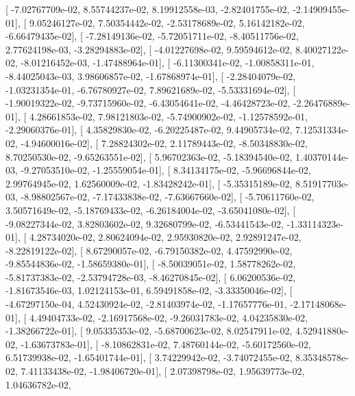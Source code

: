 \documentclass{article}
\begin{document}
       [ -7.02767709e-02,   8.55744237e-02,   8.19912558e-03,
         -2.82401755e-02,  -2.14909455e-01],
       [  9.05246127e-02,   7.50354442e-02,  -2.53178689e-02,
          5.16142182e-02,  -6.66479435e-02],
       [ -7.28149136e-02,  -5.72051711e-02,  -8.40511756e-02,
          2.77624198e-03,  -3.28294883e-02],
       [ -4.01227698e-02,   9.59594612e-02,   8.40027122e-02,
         -8.01216452e-03,  -1.47488964e-01],
       [ -6.11300341e-02,  -1.00858311e-01,  -8.44025043e-03,
          3.98606857e-02,  -1.67868974e-01],
       [ -2.28404079e-02,  -1.03231354e-01,  -6.76780927e-02,
          7.89621689e-02,  -5.53331694e-02],
       [ -1.90019322e-02,  -9.73715960e-02,  -6.43054641e-02,
         -4.46428723e-02,  -2.26476889e-01],
       [  4.28661853e-02,   7.98121803e-02,  -5.74900902e-02,
         -1.12578592e-01,  -2.29060376e-01],
       [  4.35829830e-02,  -6.20225487e-02,   9.44905734e-02,
          7.12531334e-02,  -4.94600016e-02],
       [  7.28824302e-02,   2.11789443e-02,  -8.50348830e-02,
          8.70250530e-02,  -9.65263551e-02],
       [  5.96702363e-02,  -5.18394540e-02,   1.40370144e-03,
         -9.27053510e-02,  -1.25559054e-01],
       [  8.34134175e-02,  -5.96696844e-02,   2.99764945e-02,
          1.62560009e-02,  -1.83428242e-01],
       [ -5.35315189e-02,   8.51917703e-03,  -8.98802567e-02,
         -7.17433838e-02,  -7.63667660e-02],
       [ -5.70611760e-02,   3.50571649e-02,  -5.18769433e-02,
         -6.26184004e-02,  -3.65041080e-02],
       [ -9.08227344e-02,   3.82803602e-02,   9.32680799e-02,
         -6.53441543e-02,  -1.33114323e-01],
       [  4.28734020e-02,   2.80624094e-02,   2.95930820e-02,
          2.92891247e-02,  -8.22819122e-02],
       [  8.67290057e-02,  -6.79150382e-02,   4.47592990e-02,
         -9.85544836e-02,  -1.58659380e-01],
       [ -8.50039051e-02,   1.58778262e-02,  -5.81737383e-02,
         -2.53794728e-03,  -8.46270845e-02],
       [  6.06200536e-02,  -1.81673546e-03,   1.02124153e-01,
          6.59491858e-02,  -3.33350046e-02],
       [ -4.67297150e-04,   4.52430924e-02,  -2.81403974e-02,
         -1.17657776e-01,  -2.17148068e-01],
       [  4.49404733e-02,  -2.16917568e-02,  -9.26031783e-02,
          4.04235830e-02,  -1.38266722e-01],
       [  9.05335353e-02,  -5.68700623e-02,   8.02547911e-02,
          4.52941880e-02,  -1.63673783e-01],
       [ -8.10862831e-02,   7.48760144e-02,  -5.60172560e-02,
          6.51739938e-02,  -1.65401744e-01],
       [  3.74229942e-02,  -3.74072455e-02,   8.35348578e-02,
          7.41133438e-02,  -1.98406720e-01],
       [  2.07398798e-02,   1.95639773e-02,   1.04636782e-02,
\end{document}
